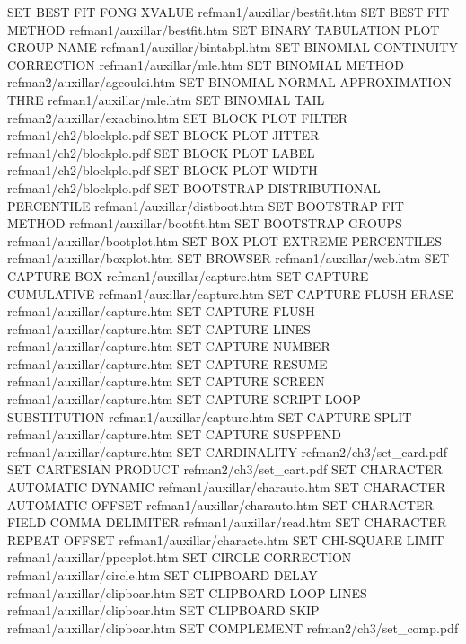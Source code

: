 SET BEST FIT FONG XVALUE                refman1/auxillar/bestfit.htm
SET BEST FIT METHOD                     refman1/auxillar/bestfit.htm
SET BINARY TABULATION PLOT GROUP NAME   refman1/auxillar/bintabpl.htm
SET BINOMIAL CONTINUITY CORRECTION      refman1/auxillar/mle.htm
SET BINOMIAL METHOD                     refman2/auxillar/agcoulci.htm
SET BINOMIAL NORMAL APPROXIMATION THRE  refman1/auxillar/mle.htm
SET BINOMIAL TAIL                       refman2/auxillar/exacbino.htm
SET BLOCK PLOT FILTER                   refman1/ch2/blockplo.pdf
SET BLOCK PLOT JITTER                   refman1/ch2/blockplo.pdf
SET BLOCK PLOT LABEL                    refman1/ch2/blockplo.pdf
SET BLOCK PLOT WIDTH                    refman1/ch2/blockplo.pdf
SET BOOTSTRAP DISTRIBUTIONAL PERCENTILE refman1/auxillar/distboot.htm
SET BOOTSTRAP FIT METHOD                refman1/auxillar/bootfit.htm
SET BOOTSTRAP GROUPS                    refman1/auxillar/bootplot.htm
SET BOX PLOT EXTREME PERCENTILES        refman1/auxillar/boxplot.htm
SET BROWSER                             refman1/auxillar/web.htm
SET CAPTURE BOX                         refman1/auxillar/capture.htm
SET CAPTURE CUMULATIVE                  refman1/auxillar/capture.htm
SET CAPTURE FLUSH ERASE                 refman1/auxillar/capture.htm
SET CAPTURE FLUSH                       refman1/auxillar/capture.htm
SET CAPTURE LINES                       refman1/auxillar/capture.htm
SET CAPTURE NUMBER                      refman1/auxillar/capture.htm
SET CAPTURE RESUME                      refman1/auxillar/capture.htm
SET CAPTURE SCREEN                      refman1/auxillar/capture.htm
SET CAPTURE SCRIPT LOOP SUBSTITUTION    refman1/auxillar/capture.htm
SET CAPTURE SPLIT                       refman1/auxillar/capture.htm
SET CAPTURE SUSPPEND                    refman1/auxillar/capture.htm
SET CARDINALITY                         refman2/ch3/set_card.pdf
SET CARTESIAN PRODUCT                   refman2/ch3/set_cart.pdf
SET CHARACTER AUTOMATIC DYNAMIC         refman1/auxillar/charauto.htm
SET CHARACTER AUTOMATIC OFFSET          refman1/auxillar/charauto.htm
SET CHARACTER FIELD COMMA DELIMITER     refman1/auxillar/read.htm
SET CHARACTER REPEAT OFFSET             refman1/auxillar/characte.htm
SET CHI-SQUARE LIMIT                    refman1/auxillar/ppccplot.htm
SET CIRCLE CORRECTION                   refman1/auxillar/circle.htm
SET CLIPBOARD DELAY                     refman1/auxillar/clipboar.htm
SET CLIPBOARD LOOP LINES                refman1/auxillar/clipboar.htm
SET CLIPBOARD SKIP                      refman1/auxillar/clipboar.htm
SET COMPLEMENT                          refman2/ch3/set_comp.pdf
